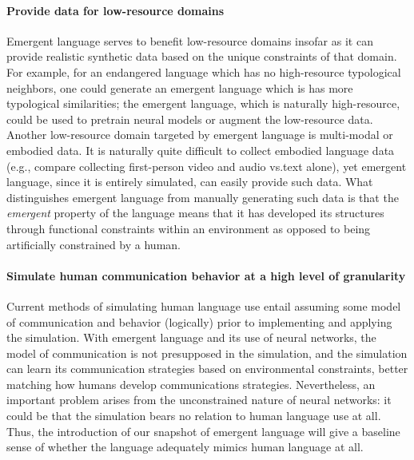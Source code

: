 \paragraph{Provide data for low-resource domains}
Emergent language serves to benefit low-resource domains insofar as it can provide realistic synthetic data based on the unique constraints of that domain.
For example, for an endangered language which has no high-resource typological neighbors, one could generate an emergent language which is has more typological similarities; the emergent language, which is naturally high-resource, could be used to pretrain neural models or augment the low-resource data.
Another low-resource domain targeted by emergent language is multi-modal or embodied data.
It is naturally quite difficult to collect embodied language data (e.g., compare collecting first-person video and audio vs.\@ text alone), yet emergent language, since it is entirely simulated, can easily provide such data.
What distinguishes emergent language from manually generating such data is that the \emph{emergent} property of the language means that it has developed its structures through functional constraints within an environment as opposed to being artificially constrained by a human.

\paragraph{Simulate human communication behavior at a high level of granularity}
Current methods of simulating human language use entail assuming some model of communication and behavior (logically) prior to implementing and applying the simulation.
With emergent language and its use of neural networks, the model of communication is not presupposed in the simulation, and the simulation can learn its communication strategies based on environmental constraints, better matching how humans develop communications strategies.
Nevertheless, an important problem arises from the unconstrained nature of neural networks: it could be that the simulation bears no relation to human language use at all.
Thus, the introduction of our snapshot of emergent language will give a baseline sense of whether the language adequately mimics human language at all.
